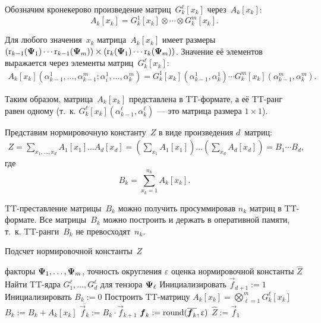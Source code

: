 Обозначим кронекерово произведение матриц~$G^\ell_k[x_k]$ через~$A_k[x_k]$:
\begin{equation*}
A_k[x_k] = G^1_k[x_k] \otimes \dotsb \otimes G^m_k[x_k].
\end{equation*}

Для любого значения~$x_k$ матрица~$A_k[x_k]$ имеет размеры $(\operatorname{r}_{k - 1}(\boldsymbol{\Psi}_1)  \dotsm  \operatorname{r}_{k - 1}(\boldsymbol{\Psi}_m)) \times (\operatorname{r}_{k}(\boldsymbol{\Psi}_1)  \dotsm  \operatorname{r}_{k}(\boldsymbol{\Psi}_m))$. Значение её элементов выражается через элементы матриц~$G_k^{\ell}[x_k]$:
\begin{multline*}
A_k[x_k](\alpha^1_{k - 1}, \dots, \alpha^m_{k - 1}; \alpha^1_i, \dots, \alpha^m_k) = G^1_k[x_k](\alpha^1_{k - 1}, \alpha^1_k)  \dotsm  G^m_k[x_k](\alpha^m_{k - 1}, \alpha^m_k).
\end{multline*}

Таким образом, матрица~$A_k[x_k]$ представлена в TT\hyp{}формате, а её TT\hyp{}ранг равен одному (т.~к. $G^{\ell}_k[x_k](\alpha^{\ell}_{k - 1}, \alpha^{\ell}_k)$ --- это матрица размера $1 \times 1$).

Представим нормировочную константу~$Z$ в виде произведения $d$~матриц:
\begin{multline*}
Z = \sum_{x_1, \dots, x_d}  A_1[x_1] \ldots  A_d[x_d]
= \left ( \sum_{x_1} A_1[x_1] \right ) \ldots  \left ( \sum_{x_d} A_d[x_d] \right ) = B_1 \dotsm  B_d,
\end{multline*}
где
\begin{equation*}
B_k = \sum_{x_k = 1}^{n_k} A_k[x_k].
\end{equation*}

TT\hyp{}преставление матрицы~$B_k$ можно получить просуммировав $n_k$ матриц в TT\hyp{}формате. Все матрицы~$B_k$ можно построить и держать в оперативной памяти, т.~к. TT\hyp{}ранги~$B_k$ не превосходят~$n_k$.

\begin{algorithm}[tb]
   \caption{Подсчет нормировочной константы~$Z$}
   \label{alg:Z-computing}
\begin{algorithmic}[1]
   \REQUIRE факторы $\boldsymbol{\Psi}_1, \dots, \boldsymbol{\Psi}_m$, точность округления $\varepsilon$
   \ENSURE оценка нормировочной константы $\widehat{Z}$
   \STATE Найти TT\hyp{}ядра $G^{\ell}_1, \dots, G^{\ell}_d$ для тензора $\boldsymbol{\Psi}_{\ell}$
   \ENDFOR
   \STATE Инициализировать $\vec{f}_{d + 1} := 1$
     \STATE Инициализировать $B_k := 0$
       \STATE Построить TT\hyp{}матрицу $A_k[x_k] = \bigotimes_{\ell = 1}^m G^\ell_k[x_k]$
       \STATE $B_k := B_k + A_k[x_k]$
     \ENDFOR
     \STATE $\overline{\vec{f}_k} := B_k \cdot \vec{f}_{k + 1}$
     \STATE $\boldsymbol{f}_k := \operatorname{round}(\overline{\boldsymbol{f}_k}, \upvarepsilon)$
   \ENDFOR
   \STATE $\widehat{Z} := \vec{f}_1$
\end{algorithmic}
\end{algorithm}

